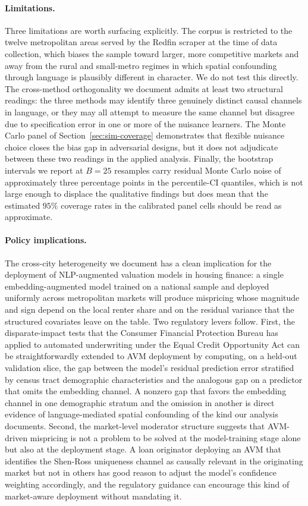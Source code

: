 \paragraph{Limitations.} Three limitations are worth surfacing
explicitly. The corpus is restricted to the twelve metropolitan areas
served by the Redfin scraper at the time of data collection, which
biases the sample toward larger, more competitive markets and away
from the rural and small-metro regimes in which spatial confounding
through language is plausibly different in character. We do not test
this directly. The cross-method orthogonality we document admits at
least two structural readings: the three methods may identify three
genuinely distinct causal channels in language, or they may all
attempt to measure the same channel but disagree due to specification
error in one or more of the nuisance learners. The Monte Carlo panel
of Section~\ref{sec:sim-coverage} demonstrates that flexible
nuisance choice closes the bias gap in adversarial designs, but it
does not adjudicate between these two readings in the applied
analysis. Finally, the bootstrap intervals we report at $B{=}25$
resamples carry residual Monte Carlo noise of approximately three
percentage points in the percentile-CI quantiles, which is not large
enough to displace the qualitative findings but does mean that the
estimated $95\%$ coverage rates in the calibrated panel cells should
be read as approximate.

\paragraph{Policy implications.} The cross-city heterogeneity we
document has a clean implication for the deployment of NLP-augmented
valuation models in housing finance: a single embedding-augmented
model trained on a national sample and deployed uniformly across
metropolitan markets will produce mispricing whose magnitude and sign
depend on the local renter share and on the residual variance that
the structured covariates leave on the table. Two regulatory levers
follow.  First, the disparate-impact tests that the Consumer Financial
Protection Bureau has applied to automated underwriting under the
Equal Credit Opportunity Act can be straightforwardly extended to AVM
deployment by computing, on a held-out validation slice, the gap
between the model's residual prediction error stratified by census
tract demographic characteristics and the analogous gap on a
predictor that omits the embedding channel. A nonzero gap that
favors the embedding channel in one demographic stratum and the
omission in another is direct evidence of language-mediated spatial
confounding of the kind our analysis documents.  Second, the
market-level moderator structure suggests that AVM-driven mispricing
is not a problem to be solved at the model-training stage alone but
also at the deployment stage. A loan originator deploying an AVM that
identifies the Shen-Ross uniqueness channel as causally relevant in
the originating market but not in others has good reason to adjust
the model's confidence weighting accordingly, and the regulatory
guidance can encourage this kind of market-aware deployment without
mandating it.

